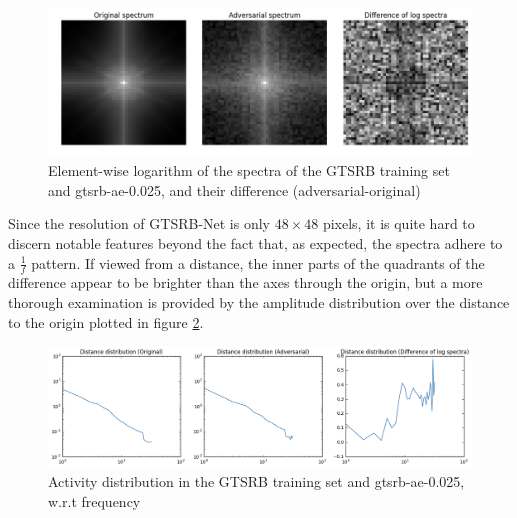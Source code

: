 \documentclass[11pt, a4paper]{article}
\begin{document}
\begin{figure}[h!tb]
	\centering
	\includegraphics[width=\textwidth]{images/spectra/gtsrb-ae-0dot025-minconfidence-0dot5-maxorig-0-spectra.png}
	\caption[Log spectra of GTSRB and adversarial examples]{Element-wise logarithm of the spectra of the GTSRB training set and gtsrb-ae-0.025, and their difference (adversarial-original)}
	\label{fig:gtsrb-ae-0dot025-spectra}
\end{figure}

Since the resolution of GTSRB-Net is only $48 \times 48$ pixels, it is quite hard to discern notable features beyond the fact that, as expected, the spectra adhere to a $\frac{1}{f}$ pattern. If viewed from a distance, the inner parts of the quadrants of the difference appear to be brighter than the axes through the origin, but a more thorough examination is provided by the amplitude distribution over the distance to the origin plotted in figure \ref{fig:gtsrb-ae-0dot025-frequency}.

\begin{figure}[h!tb]
	\centering
	\includegraphics[width=\textwidth]{images/spectra/gtsrb-ae-0dot025-minconfidence-0dot5-maxorig-0-distance-33-bins.png}
	\caption[Log spectra of GTSRB and adversarial examples, frequency analysis]{Activity distribution in the GTSRB training set and gtsrb-ae-0.025, w.r.t frequency}
	\label{fig:gtsrb-ae-0dot025-frequency}
\end{figure}
\end{document}
